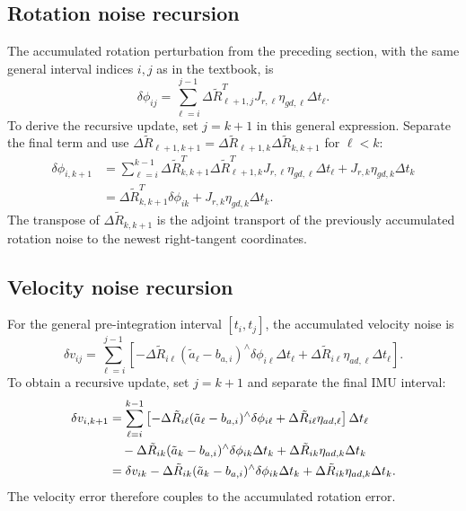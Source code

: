 \documentclass[11pt,a4paper]{article}
\begin{document}
\subsection{Rotation noise recursion}
The accumulated rotation perturbation from the preceding section, with the
same general interval indices $i,j$ as in the textbook, is
\begin{equation}
\delta\phi_{ij}
=\sum_{\ell=i}^{j-1} \Delta\tilde R_{\ell+1,j}^{T}
 J_{r,\ell}\eta_{gd,\ell}\Delta t_\ell.
\end{equation}
To derive the recursive update, set $j=k+1$ in this general expression.
Separate the final term and use
$\Delta\tilde R_{\ell+1,k+1}
=\Delta\tilde R_{\ell+1,k}\Delta\tilde R_{k,k+1}$ for $\ell<k$:
\begin{align}
\delta\phi_{i,k+1}
&=\sum_{\ell=i}^{k-1}\Delta\tilde R_{k,k+1}^T\Delta\tilde R_{\ell+1,k}^{T}
 J_{r,\ell}\eta_{gd,\ell}\Delta t_\ell
 +J_{r,k}\eta_{gd,k}\Delta t_k\\
&=\boxed{\Delta\tilde R_{k,k+1}^T\delta\phi_{ik}+J_{r,k}\eta_{gd,k}\Delta t_k}.
\end{align}
The transpose of $\Delta\tilde R_{k,k+1}$ is the adjoint transport of the previously
accumulated rotation noise to the newest right-tangent coordinates.

\subsection{Velocity noise recursion}
For the general pre-integration interval $[t_i,t_j]$, the accumulated
velocity noise is
\begin{equation}
\delta v_{ij}
=\sum_{\ell=i}^{j-1}\left[
-\Delta\tilde R_{i\ell}(\tilde a_\ell-b_{a,i})^\wedge
\delta\phi_{i\ell}\Delta t_\ell
+\Delta\tilde R_{i\ell}\eta_{ad,\ell}\Delta t_\ell
\right].
\end{equation}
To obtain a recursive update, set $j=k+1$ and separate the final
IMU interval:
\begin{align}
\delta v_{i,k+1}
&=\sum_{\ell=i}^{k-1}\left[
-\Delta\tilde R_{i\ell}(\tilde a_\ell-b_{a,i})^\wedge
\delta\phi_{i\ell}
+\Delta\tilde R_{i\ell}\eta_{ad,\ell}\right]\Delta t_\ell\notag\\
&\quad-\Delta\tilde R_{ik}(\tilde a_k-b_{a,i})^\wedge
\delta\phi_{ik}\Delta t_k
+\Delta\tilde R_{ik}\eta_{ad,k}\Delta t_k\\
&=\delta v_{ik}
-\Delta\tilde R_{ik}(\tilde a_k-b_{a,i})^\wedge
\delta\phi_{ik}\Delta t_k
+\Delta\tilde R_{ik}\eta_{ad,k}\Delta t_k.
\end{align}
The velocity error therefore couples to the accumulated rotation error.
\end{document}
